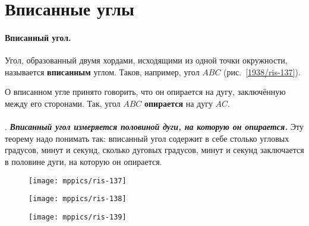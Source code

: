 \section{Вписанные углы}

\paragraph{Вписанный угол.}\label{1938/123}
Угол, образованный двумя хордами, исходящими из одной точки окружности, называется \textbf{вписанным} углом.
Таков, например, угол $ABC$ (рис.~\ref{1938/ris-137}).

О вписанном угле принято говорить, что он опирается на дугу, заключённую между его сторонами.
Так, угол $ABC$ {}\textbf{опирается} на дугу $AC$.

\paragraph{}\label{1938/124} 
.
\textbf{\emph{Вписанный угол измеряется половиной дуги, на которую он опирается.}}
Эту теорему надо понимать так:
вписанный угол содержит в себе столько угловых градусов, минут и секунд, сколько дуговых градусов, минут и секунд заключается в половине дуги, на которую он опирается.

\begin{figure}[h]
\begin{minipage}{.32\textwidth}
\centering
\texttt{[image: mppics/ris-137]}
\end{minipage}
\hfill
\begin{minipage}{.32\textwidth}
\centering
\texttt{[image: mppics/ris-138]}
\end{minipage}
\hfill
\begin{minipage}{.32\textwidth}
\centering
\texttt{[image: mppics/ris-139]}
\end{minipage}

\medskip

\begin{minipage}{.32\textwidth}
\centering
\caption{}\label{1938/ris-137}
\end{minipage}
\hfill
\begin{minipage}{.32\textwidth}
\centering
\caption{}\label{1938/ris-138}
\end{minipage}
\hfill
\begin{minipage}{.32\textwidth}
\centering
\caption{}\label{1938/ris-139}
\end{minipage}
\vskip-4mm
\end{figure}

